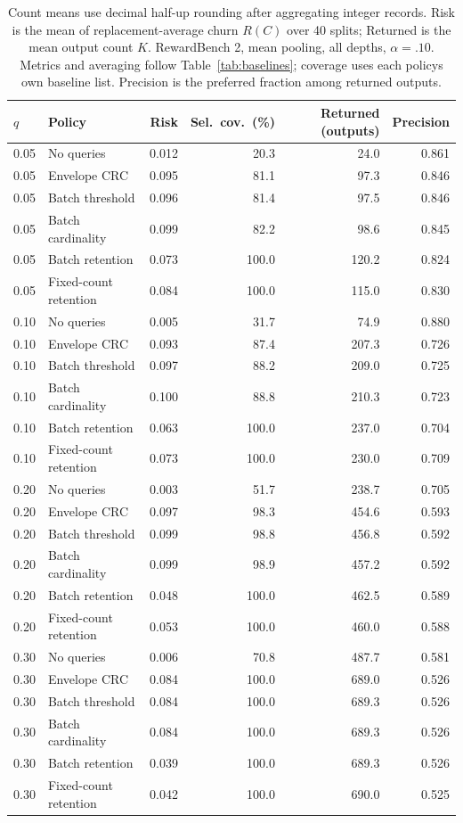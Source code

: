 \begin{table}[t]
\centering\small
\begin{tabular}{llrrrr}
\toprule
$q$ & Policy & Risk & Sel.\ cov.\ (\%) & Returned (outputs) & Precision \\
\midrule
0.05 & No queries & 0.012 & 20.3 & 24.0 & 0.861 \\
0.05 & Envelope CRC & 0.095 & 81.1 & 97.3 & 0.846 \\
0.05 & Batch threshold & 0.096 & 81.4 & 97.5 & 0.846 \\
0.05 & Batch cardinality & 0.099 & 82.2 & 98.6 & 0.845 \\
0.05 & Batch retention & 0.073 & 100.0 & 120.2 & 0.824 \\
0.05 & Fixed-count retention & 0.084 & 100.0 & 115.0 & 0.830 \\
0.10 & No queries & 0.005 & 31.7 & 74.9 & 0.880 \\
0.10 & Envelope CRC & 0.093 & 87.4 & 207.3 & 0.726 \\
0.10 & Batch threshold & 0.097 & 88.2 & 209.0 & 0.725 \\
0.10 & Batch cardinality & 0.100 & 88.8 & 210.3 & 0.723 \\
0.10 & Batch retention & 0.063 & 100.0 & 237.0 & 0.704 \\
0.10 & Fixed-count retention & 0.073 & 100.0 & 230.0 & 0.709 \\
0.20 & No queries & 0.003 & 51.7 & 238.7 & 0.705 \\
0.20 & Envelope CRC & 0.097 & 98.3 & 454.6 & 0.593 \\
0.20 & Batch threshold & 0.099 & 98.8 & 456.8 & 0.592 \\
0.20 & Batch cardinality & 0.099 & 98.9 & 457.2 & 0.592 \\
0.20 & Batch retention & 0.048 & 100.0 & 462.5 & 0.589 \\
0.20 & Fixed-count retention & 0.053 & 100.0 & 460.0 & 0.588 \\
0.30 & No queries & 0.006 & 70.8 & 487.7 & 0.581 \\
0.30 & Envelope CRC & 0.084 & 100.0 & 689.0 & 0.526 \\
0.30 & Batch threshold & 0.084 & 100.0 & 689.3 & 0.526 \\
0.30 & Batch cardinality & 0.084 & 100.0 & 689.3 & 0.526 \\
0.30 & Batch retention & 0.039 & 100.0 & 689.3 & 0.526 \\
0.30 & Fixed-count retention & 0.042 & 100.0 & 690.0 & 0.525 \\
\bottomrule
\end{tabular}
\caption{Count means use decimal half-up rounding after aggregating integer records. Risk is the mean of replacement-average churn $R(C)$ over 40 splits; Returned is the mean output count $K$. RewardBench 2, mean pooling, all depths, $\alpha=.10$. Metrics and averaging follow Table~\ref{tab:baselines}; coverage uses each policy\textquotesingle s own baseline list. Precision is the preferred fraction among returned outputs.}
\label{tab:baseline-0-mean}
\end{table}
